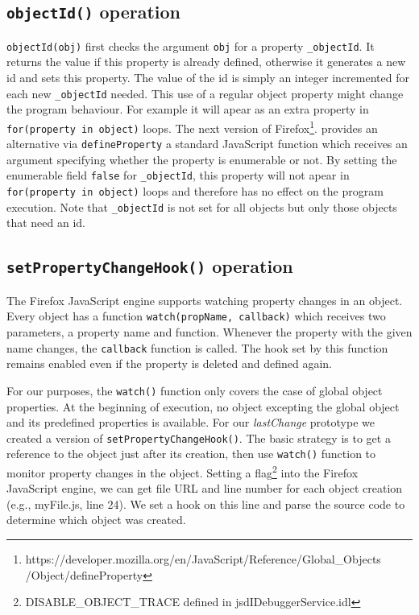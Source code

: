 \documentclass[runningheads,a4paper]{llncs}
\begin{document}
\subsection{\texttt{objectId()} operation}
\texttt{objectId(obj)} first checks the argument \texttt{obj} for a property \texttt{\_objectId}.
It returns the value if this property is already defined,
otherwise it generates a new id and sets this property. The value of the id is simply an integer incremented 
for each new \texttt{\_objectId} needed. This use of a regular object property  might change
the program behaviour. For example it will apear as an extra property in 
\texttt{for(property in object)} loops. 
The next version of Firefox\footnote[1]{https://developer.mozilla.org/en/JavaScript/Reference/Global\_Objects\\/Object/defineProperty}.
provides an alternative via \texttt{defineProperty} a standard JavaScript
function which receives 
an argument specifying whether the property is enumerable or not. By setting the enumerable
field \texttt{false} for \texttt{\_objectId}, this property will not
apear in \texttt{for(property in object)} loops and therefore has no
effect on the program execution. Note that \texttt{\_objectId} is
not set for all objects but only those objects that need an id.

\subsection{\texttt{setPropertyChangeHook()} operation}
The Firefox JavaScript engine supports watching property changes in an
object. Every object has a function \texttt{watch(propName, callback)}
which receives two parameters, a property name and function.  Whenever
the property with the given name changes, the \texttt{callback} function is
called. The hook set by this function remains enabled even if the
property is deleted and defined again. 

For our purposes, the \texttt{watch()} function only covers the case
of global object properties. At the beginning of execution, no object
excepting the global object and its predefined properties is available.  For 
our \textit{lastChange} prototype we created a version of
\texttt{setPropertyChangeHook()}.  The basic strategy is to get a reference to the object just
after its creation, then use \texttt{watch()} function to monitor
property changes in the object. Setting a flag\footnote[2]{DISABLE\_OBJECT\_TRACE defined in jsdIDebuggerService.idl} into the Firefox 
JavaScript engine, we can get file URL and line number for each object
creation (e.g., myFile.js, line 24). We set a hook on this line
and parse the source code to determine which object was created.
\end{document}
